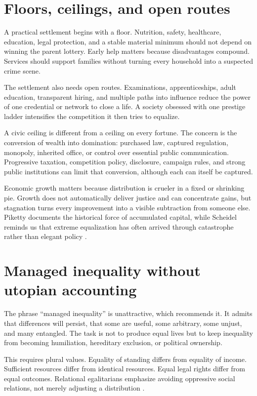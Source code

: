 \documentclass[12pt,a4paper]{book}
\begin{document}
\section{Floors, ceilings, and open routes}

A practical settlement begins with a floor.  Nutrition, safety, healthcare,
education, legal protection, and a stable material minimum should not depend
on winning the parent lottery.  Early help matters because disadvantages
compound.  Services should support families without turning every household
into a suspected crime scene.

The settlement also needs open routes.  Examinations, apprenticeships, adult
education, transparent hiring, and multiple paths into influence reduce the
power of one credential or network to close a life.  A society obsessed with
one prestige ladder intensifies the competition it then tries to equalize.

A civic ceiling is different from a ceiling on every fortune.  The concern is
the conversion of wealth into domination: purchased law, captured regulation,
monopoly, inherited office, or control over essential public communication.
Progressive taxation, competition policy, disclosure, campaign rules, and
strong public institutions can limit that conversion, although each can itself
be captured.

Economic growth matters because distribution is crueler in a fixed or shrinking
pie.  Growth does not automatically deliver justice and can concentrate gains,
but stagnation turns every improvement into a visible subtraction from someone
else.  Piketty documents the historical force of accumulated capital, while
Scheidel reminds us that extreme equalization has often arrived through
catastrophe rather than elegant policy \cite{Piketty2014,Scheidel-2017}.

\section{Managed inequality without utopian accounting}

The phrase ``managed inequality'' is unattractive, which recommends it.  It
admits that differences will persist, that some are useful, some arbitrary,
some unjust, and many entangled.  The task is not to produce equal lives but to
keep inequality from becoming humiliation, hereditary exclusion, or political
ownership.

This requires plural values.  Equality of standing differs from equality of
income.  Sufficient resources differ from identical resources.  Equal legal
rights differ from equal outcomes.  Relational egalitarians emphasize avoiding
oppressive social relations, not merely adjusting a distribution
\cite{Dworkin2000,Anderson1999}.
\end{document}
